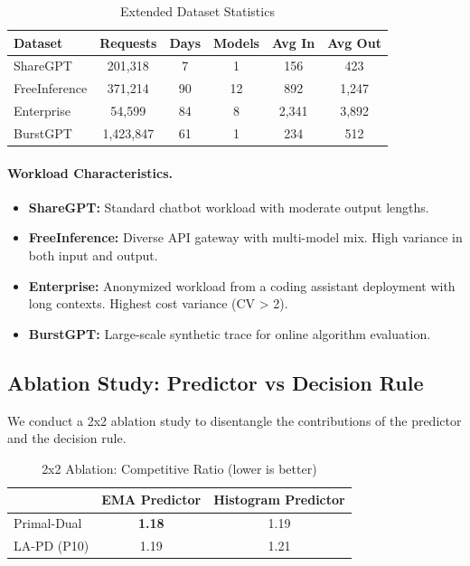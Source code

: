 \begin{table}[h]
\caption{Extended Dataset Statistics}
\label{tab:datasets_extended}
\begin{center}
\begin{tabular}{lccccc}
\toprule
Dataset & Requests & Days & Models & Avg In & Avg Out \\
\midrule
ShareGPT & 201,318 & 7 & 1 & 156 & 423 \\
FreeInference & 371,214 & 90 & 12 & 892 & 1,247 \\
Enterprise & 54,599 & 84 & 8 & 2,341 & 3,892 \\
BurstGPT & 1,423,847 & 61 & 1 & 234 & 512 \\
\bottomrule
\end{tabular}
\end{center}
\end{table}

\paragraph{Workload Characteristics.}
\begin{itemize}
    \item \textbf{ShareGPT:} Standard chatbot workload with moderate output lengths.
    \item \textbf{FreeInference:} Diverse API gateway with multi-model mix. High variance in both input and output.
    \item \textbf{Enterprise:} Anonymized workload from a coding assistant deployment with long contexts. Highest cost variance (CV > 2).
    \item \textbf{BurstGPT:} Large-scale synthetic trace for online algorithm evaluation.
\end{itemize}

\subsection{Ablation Study: Predictor vs Decision Rule}
\label{app:ablation}

We conduct a 2x2 ablation study to disentangle the contributions of the predictor and the decision rule.

\begin{table}[h]
\caption{2x2 Ablation: Competitive Ratio (lower is better)}
\label{tab:ablation_extended}
\begin{center}
\begin{tabular}{lcc}
\toprule
 & EMA Predictor & Histogram Predictor \\
\midrule
Primal-Dual & \textbf{1.18} & 1.19 \\
LA-PD (P10) & 1.19 & 1.21 \\
\bottomrule
\end{tabular}
\end{center}
\end{table}


